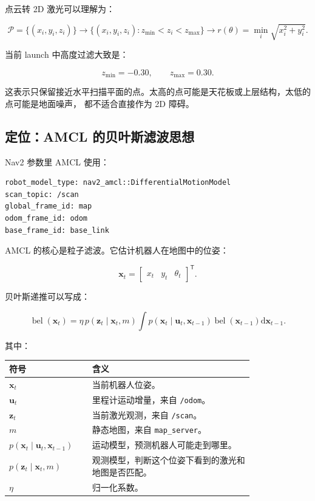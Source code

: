 \documentclass[UTF8,11pt,a4paper]{ctexart}
\newcommand{\T}{^{\mathsf T}}
\newcommand{\dd}{\mathrm d}
\newcommand{\bs}[1]{\bm{#1}}
\begin{document}
点云转 2D 激光可以理解为：

\[
\boxed{
\mathcal P=\{(x_i,y_i,z_i)\}
\rightarrow
\{(x_i,y_i,z_i): z_{\min}<z_i<z_{\max}\}
\rightarrow
r(\theta)=\min_i\sqrt{x_i^2+y_i^2}.
}
\]

当前 launch 中高度过滤大致是：

\[
z_{\min}=-0.30,\qquad z_{\max}=0.30.
\]

这表示只保留接近水平扫描平面的点。太高的点可能是天花板或上层结构，太低的点可能是地面噪声，
都不适合直接作为 2D 障碍。

\subsection{定位：AMCL 的贝叶斯滤波思想}

Nav2 参数里 AMCL 使用：

\begin{verbatim}
robot_model_type: nav2_amcl::DifferentialMotionModel
scan_topic: /scan
global_frame_id: map
odom_frame_id: odom
base_frame_id: base_link
\end{verbatim}

AMCL 的核心是粒子滤波。它估计机器人在地图中的位姿：

\[
\bs x_t=
\begin{bmatrix}
x_t & y_t & \theta_t
\end{bmatrix}\T.
\]

贝叶斯递推可以写成：

\[
\boxed{
\operatorname{bel}(\bs x_t)
=
\eta\,
p(\bs z_t\mid \bs x_t,m)
\int
p(\bs x_t\mid \bs u_t,\bs x_{t-1})
\operatorname{bel}(\bs x_{t-1})
\dd \bs x_{t-1}.
}
\]

其中：

\begin{center}
\renewcommand{\arraystretch}{1.25}
\begin{tabular}{p{0.24\linewidth}p{0.56\linewidth}}
\toprule
\textbf{符号} & \textbf{含义}\\
\midrule
\(\bs x_t\) & 当前机器人位姿。\\
\(\bs u_t\) & 里程计运动增量，来自 \texttt{/odom}。\\
\(\bs z_t\) & 当前激光观测，来自 \texttt{/scan}。\\
\(m\) & 静态地图，来自 \texttt{map\_server}。\\
\(p(\bs x_t\mid\bs u_t,\bs x_{t-1})\) & 运动模型，预测机器人可能走到哪里。\\
\(p(\bs z_t\mid\bs x_t,m)\) & 观测模型，判断这个位姿下看到的激光和地图是否匹配。\\
\(\eta\) & 归一化系数。\\
\bottomrule
\end{tabular}
\end{center}
\end{document}
